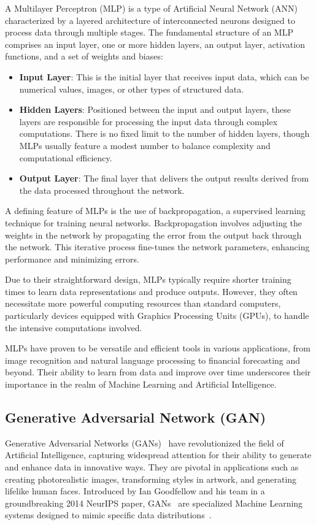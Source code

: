\documentclass[12pt,a4paper]{report}
\begin{document}
A Multilayer Perceptron (MLP) is a type of Artificial Neural Network (ANN) characterized by a layered architecture of interconnected neurons designed to process data through multiple stages. The fundamental structure of an MLP comprises an input layer, one or more hidden layers, an output layer, activation functions, and a set of weights and biases:

\begin{itemize}
  \item \textbf{Input Layer}: This is the initial layer that receives input data, which can be numerical values, images, or other types of structured data.
  \item \textbf{Hidden Layers}: Positioned between the input and output layers, these layers are responsible for processing the input data through complex computations. There is no fixed limit to the number of hidden layers, though MLPs usually feature a modest number to balance complexity and computational efficiency.
  \item \textbf{Output Layer}: The final layer that delivers the output results derived from the data processed throughout the network.
\end{itemize}

A defining feature of MLPs is the use of backpropagation, a supervised learning technique for training neural networks. Backpropagation involves adjusting the weights in the network by propagating the error from the output back through the network. This iterative process fine-tunes the network parameters, enhancing performance and minimizing errors.

Due to their straightforward design, MLPs typically require shorter training times to learn data representations and produce outputs. However, they often necessitate more powerful computing resources than standard computers, particularly devices equipped with Graphics Processing Units (GPUs), to handle the intensive computations involved.

MLPs have proven to be versatile and efficient tools in various applications, from image recognition and natural language processing to financial forecasting and beyond. Their ability to learn from data and improve over time underscores their importance in the realm of Machine Learning and Artificial Intelligence.

\subsection{Generative Adversarial Network (GAN)}
Generative Adversarial Networks (GANs)~\cite{goodfellow2014generative} have revolutionized the field of Artificial Intelligence, capturing widespread attention for their ability to generate and enhance data in innovative ways. They are pivotal in applications such as creating photorealistic images, transforming styles in artwork, and generating lifelike human faces. Introduced by Ian Goodfellow and his team in a groundbreaking 2014 NeurIPS paper, GANs~\cite{goodfellow2014generative} are specialized Machine Learning systems designed to mimic specific data distributions~\cite{gan}.
\end{document}
